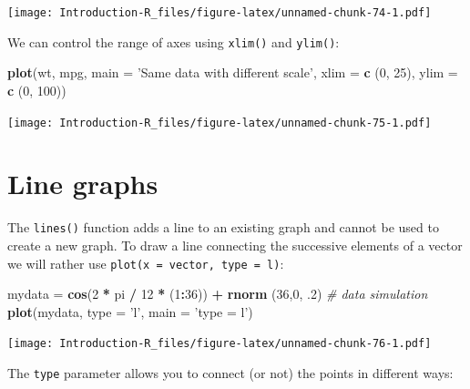 \documentclass[]{book}
\newenvironment{Shaded}{\begin{snugshade}}{\end{snugshade}}
\newcommand{\CommentTok}[1]{\textcolor[rgb]{0.56,0.35,0.01}{\textit{#1}}}
\newcommand{\DataTypeTok}[1]{\textcolor[rgb]{0.13,0.29,0.53}{#1}}
\newcommand{\DecValTok}[1]{\textcolor[rgb]{0.00,0.00,0.81}{#1}}
\newcommand{\FloatTok}[1]{\textcolor[rgb]{0.00,0.00,0.81}{#1}}
\newcommand{\KeywordTok}[1]{\textcolor[rgb]{0.13,0.29,0.53}{\textbf{#1}}}
\newcommand{\NormalTok}[1]{#1}
\newcommand{\OperatorTok}[1]{\textcolor[rgb]{0.81,0.36,0.00}{\textbf{#1}}}
\newcommand{\StringTok}[1]{\textcolor[rgb]{0.31,0.60,0.02}{#1}}
\begin{document}
\texttt{[image: Introduction-R\_files/figure-latex/unnamed-chunk-74-1.pdf]}

We can control the range of axes using \texttt{xlim()} and \texttt{ylim()}:

\begin{Shaded}
\begin{Highlighting}[]
\KeywordTok{plot}\NormalTok{(wt, mpg, }\DataTypeTok{main =} \StringTok{'Same data with different scale'}\NormalTok{,}
     \DataTypeTok{xlim =} \KeywordTok{c}\NormalTok{ (}\DecValTok{0}\NormalTok{, }\DecValTok{25}\NormalTok{),}
     \DataTypeTok{ylim =} \KeywordTok{c}\NormalTok{ (}\DecValTok{0}\NormalTok{, }\DecValTok{100}\NormalTok{))}
\end{Highlighting}
\end{Shaded}

\texttt{[image: Introduction-R\_files/figure-latex/unnamed-chunk-75-1.pdf]}

\hypertarget{line-graphs}{%
\section{Line graphs}\label{line-graphs}}

The \texttt{lines()} function adds a line to an existing graph and cannot be used to create a new graph. To draw a line connecting the successive elements of a vector we will rather use \texttt{plot(x\ =\ vector,\ type\ =\ l)}:

\begin{Shaded}
\begin{Highlighting}[]
\NormalTok{mydata =}\StringTok{ }\KeywordTok{cos}\NormalTok{(}\DecValTok{2} \OperatorTok{*}\StringTok{ }\NormalTok{pi }\OperatorTok{/}\StringTok{ }\DecValTok{12} \OperatorTok{*}\StringTok{ }\NormalTok{(}\DecValTok{1}\OperatorTok{:}\DecValTok{36}\NormalTok{)) }\OperatorTok{+}\StringTok{ }\KeywordTok{rnorm}\NormalTok{ (}\DecValTok{36}\NormalTok{,}\DecValTok{0}\NormalTok{, }\FloatTok{.2}\NormalTok{) }\CommentTok{# data simulation}
\KeywordTok{plot}\NormalTok{(mydata, }\DataTypeTok{type =} \StringTok{'l'}\NormalTok{, }\DataTypeTok{main =} \StringTok{'type = l'}\NormalTok{)}
\end{Highlighting}
\end{Shaded}

\texttt{[image: Introduction-R\_files/figure-latex/unnamed-chunk-76-1.pdf]}

The \texttt{type} parameter allows you to connect (or not) the points in different ways:
\end{document}
